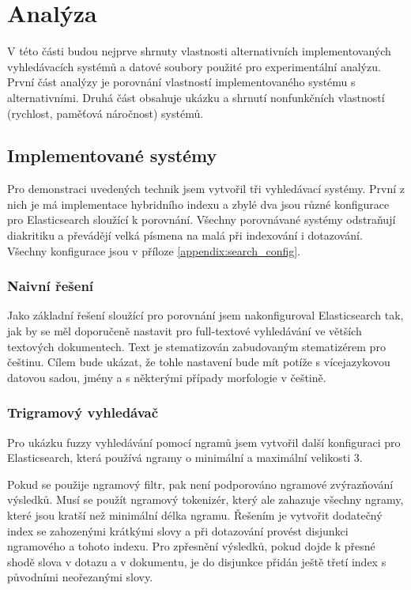 \documentclass[11pt,letterpaper,oneside,openright]{book}
\begin{document}
\chapter{Analýza}
V této části budou nejprve shrnuty vlastnosti alternativních implementovaných
vyhledávacích systémů a datové soubory použité pro experimentální analýzu.
První část analýzy je porovnání vlastností implementovaného systému s
alternativními. Druhá část obsahuje ukázku a shrnutí nonfunkčních vlastností
(rychlost, paměťová náročnost) systémů.

\section{Implementované systémy}
Pro demonstraci uvedených technik jsem vytvořil tři vyhledávací systémy. První
z nich je má implementace hybridního indexu a zbylé dva jsou různé konfigurace
pro Elasticsearch sloužící k porovnání. Všechny porovnávané systémy odstraňují
diakritiku a převádějí velká písmena na malá při indexování i dotazování.
Všechny konfigurace jsou v příloze \ref{appendix:search_config}.

\subsection{Naivní řešení}
Jako základní řešení sloužící pro porovnání jsem nakonfiguroval Elasticsearch
tak, jak by se měl doporučeně nastavit pro full-textové vyhledávání ve větších
textových dokumentech. Text je stematizován zabudovaným stematizérem pro
češtinu. Cílem bude ukázat, že tohle nastavení bude mít potíže s vícejazykovou
datovou sadou, jmény a s některými případy morfologie v češtině.

\subsection{Trigramový vyhledávač}
Pro ukázku fuzzy vyhledávání pomocí ngramů jsem vytvořil další konfiguraci pro
Elasticsearch, která používá ngramy o minimální a maximální velikosti 3.

Pokud se použije ngramový filtr, pak není podporováno ngramové zvýrazňování
výsledků. Musí se použít ngramový tokenizér, který ale zahazuje všechny ngramy,
které jsou kratší než minimální délka ngramu. Řešením je vytvořit dodatečný
index se zahozenými krátkými slovy a při dotazování provést disjunkci
ngramového a tohoto indexu. Pro zpřesnění výsledků, pokud dojde k přesné shodě
slova v dotazu a v dokumentu, je do disjunkce přidán ještě třetí index s
původními neořezanými slovy.
\end{document}

